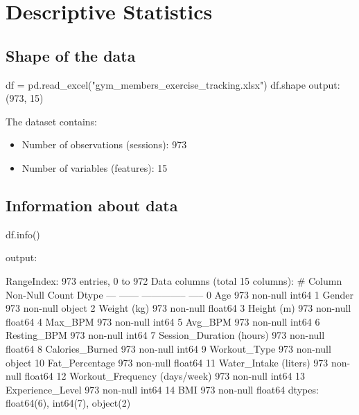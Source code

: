 \documentclass[12pt,a4paper]{report}
\begin{document}
\section{Descriptive Statistics}
\subsection{Shape of the data}
\begin{code}
df = pd.read_excel("gym_members_exercise_tracking.xlsx")
df.shape
output:
    (973, 15)
\end{code}
The dataset contains:
\begin{itemize}[itemsep=0pt]
\item Number of observations (sessions): 973
\item Number of variables (features): 15
\end{itemize}

\subsection{Information about data}
\begin{code}
df.info()
\end{code}
output:
\begin{out}
RangeIndex: 973 entries, 0 to 972
Data columns (total 15 columns):
 #   Column                         Non-Null Count  Dtype
---  ------                         --------------  -----
 0   Age                            973 non-null    int64
 1   Gender                         973 non-null    object
 2   Weight (kg)                    973 non-null    float64
 3   Height (m)                     973 non-null    float64
 4   Max_BPM                        973 non-null    int64
 5   Avg_BPM                        973 non-null    int64
 6   Resting_BPM                    973 non-null    int64
 7   Session_Duration (hours)       973 non-null    float64
 8   Calories_Burned                973 non-null    int64
 9   Workout_Type                   973 non-null    object
 10  Fat_Percentage                 973 non-null    float64
 11  Water_Intake (liters)          973 non-null    float64
 12  Workout_Frequency (days/week)  973 non-null    int64
 13  Experience_Level               973 non-null    int64
 14  BMI                            973 non-null    float64
dtypes: float64(6), int64(7), object(2)
\end{out}
\end{document}
